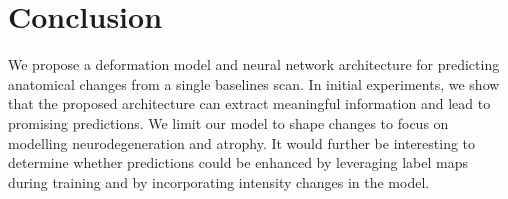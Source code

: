 \documentclass{midl} %
\begin{document}
\vspace{-0.3cm}
\section{Conclusion}
\vspace{-0.2cm}
We propose a deformation model and neural network architecture for predicting anatomical changes from a single baselines scan. In initial experiments, we show that the proposed architecture can extract meaningful information and lead to promising predictions. We limit our model to shape changes to focus on modelling neurodegeneration and atrophy. It would further be interesting to determine whether predictions could be enhanced by leveraging label maps during training and by incorporating intensity changes in the model.
\vspace{-0.3cm}



\vspace{-0.3cm}


\vspace{-0.3cm}
\appendix




\end{document}
